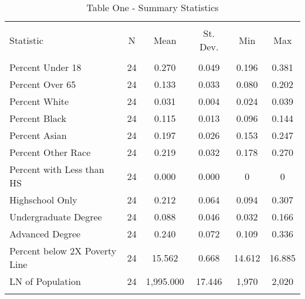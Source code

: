 
\begin{table}[!htbp] \centering 
  \caption{Table One - Summary Statistics} 
  \label{} 
\begin{tabular}{@{\extracolsep{5pt}}lccccc} 
\\[-1.8ex]\hline 
\hline \\[-1.8ex] 
Statistic & \multicolumn{1}{c}{N} & \multicolumn{1}{c}{Mean} & \multicolumn{1}{c}{St. Dev.} & \multicolumn{1}{c}{Min} & \multicolumn{1}{c}{Max} \\ 
\hline \\[-1.8ex] 
Percent Under 18 & 24 & 0.270 & 0.049 & 0.196 & 0.381 \\ 
Percent Over 65 & 24 & 0.133 & 0.033 & 0.080 & 0.202 \\ 
Percent White & 24 & 0.031 & 0.004 & 0.024 & 0.039 \\ 
Percent Black & 24 & 0.115 & 0.013 & 0.096 & 0.144 \\ 
Percent Asian & 24 & 0.197 & 0.026 & 0.153 & 0.247 \\ 
Percent Other Race & 24 & 0.219 & 0.032 & 0.178 & 0.270 \\ 
Percent with Less than HS & 24 & 0.000 & 0.000 & 0 & 0 \\ 
Highschool Only & 24 & 0.212 & 0.064 & 0.094 & 0.307 \\ 
Undergraduate Degree & 24 & 0.088 & 0.046 & 0.032 & 0.166 \\ 
Advanced Degree & 24 & 0.240 & 0.072 & 0.109 & 0.336 \\ 
Percent below 2X Poverty Line & 24 & 15.562 & 0.668 & 14.612 & 16.885 \\ 
LN of Population & 24 & 1,995.000 & 17.446 & 1,970 & 2,020 \\ 
\hline \\[-1.8ex] 
\end{tabular} 
\end{table} 
